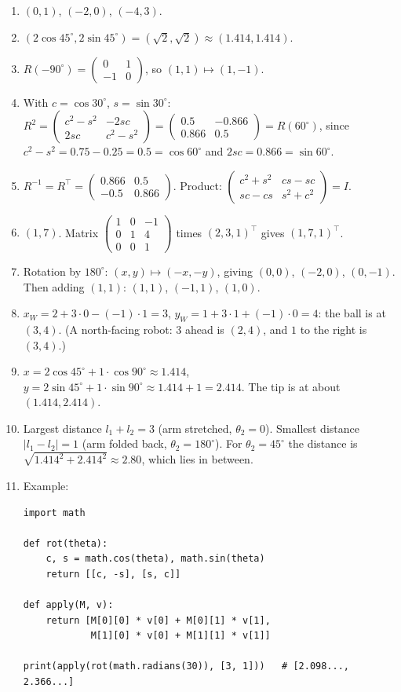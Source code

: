 \begin{enumerate}[label=\textbf{\ansnum.\arabic*}]
  \item $(0,1)$, $(-2,0)$, $(-4,3)$.
  \item $(2\cos45^\circ,2\sin45^\circ)=(\sqrt2,\sqrt2)\approx(1.414,1.414)$.
  \item $R(-90^\circ)=\begin{pmatrix}0&1\\-1&0\end{pmatrix}$, so $(1,1)\mapsto(1,-1)$.
  \item With $c=\cos30^\circ$, $s=\sin30^\circ$: $R^2=\begin{pmatrix}c^2-s^2&-2sc\\2sc&c^2-s^2\end{pmatrix}=\begin{pmatrix}0.5&-0.866\\0.866&0.5\end{pmatrix}=R(60^\circ)$, since $c^2-s^2=0.75-0.25=0.5=\cos60^\circ$ and $2sc=0.866=\sin60^\circ$.
  \item $R^{-1}=R^\top=\begin{pmatrix}0.866&0.5\\-0.5&0.866\end{pmatrix}$. Product: $\begin{pmatrix}c^2+s^2&cs-sc\\sc-cs&s^2+c^2\end{pmatrix}=I$.
  \item $(1,7)$. Matrix $\begin{pmatrix}1&0&-1\\0&1&4\\0&0&1\end{pmatrix}$ times $(2,3,1)^\top$ gives $(1,7,1)^\top$.
  \item Rotation by $180^\circ$: $(x,y)\mapsto(-x,-y)$, giving $(0,0)$, $(-2,0)$, $(0,-1)$. Then adding $(1,1)$: $(1,1)$, $(-1,1)$, $(1,0)$.
  \item $x_W=2+3\cdot0-(-1)\cdot1=3$, $y_W=1+3\cdot1+(-1)\cdot0=4$: the ball is at $(3,4)$. (A north-facing robot: $3$ ahead is $(2,4)$, and $1$ to the right is $(3,4)$.)
  \item $x=2\cos45^\circ+1\cdot\cos90^\circ\approx1.414$, $y=2\sin45^\circ+1\cdot\sin90^\circ\approx1.414+1=2.414$. The tip is at about $(1.414,2.414)$.
  \item Largest distance $l_1+l_2=3$ (arm stretched, $\theta_2=0$). Smallest distance $|l_1-l_2|=1$ (arm folded back, $\theta_2=180^\circ$). For $\theta_2=45^\circ$ the distance is $\sqrt{1.414^2+2.414^2}\approx2.80$, which lies in between.
  \item Example:
\begin{verbatim}
import math

def rot(theta):
    c, s = math.cos(theta), math.sin(theta)
    return [[c, -s], [s, c]]

def apply(M, v):
    return [M[0][0] * v[0] + M[0][1] * v[1],
            M[1][0] * v[0] + M[1][1] * v[1]]

print(apply(rot(math.radians(30)), [3, 1]))   # [2.098..., 2.366...]
\end{verbatim}
\end{enumerate}
